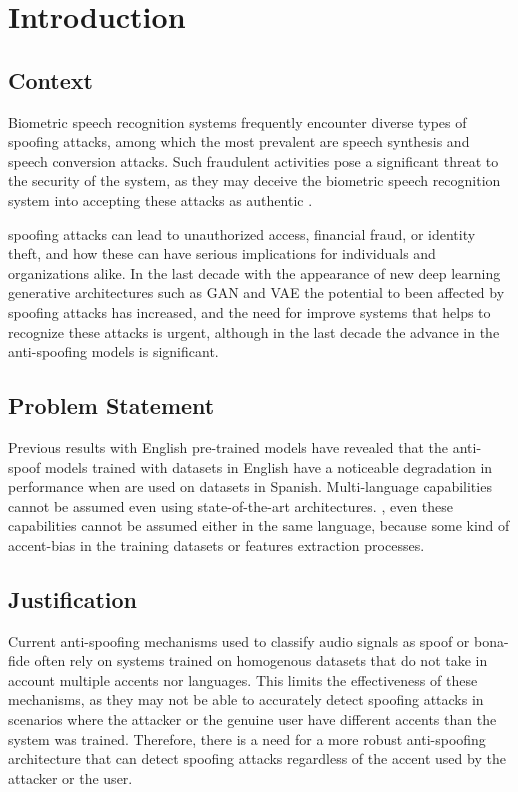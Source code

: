 \chapter{Introduction}

\section{Context}
Biometric speech recognition systems frequently encounter diverse types of spoofing attacks, among which the most prevalent are speech synthesis and speech conversion attacks. Such fraudulent activities pose a significant threat to the security of the system, as they may deceive the biometric speech recognition system into accepting these attacks as authentic \cite{xue2023physiological}.

spoofing attacks can lead to unauthorized access, financial fraud, or identity theft, and how these can have serious implications for individuals and organizations alike. In the last decade with the appearance of new deep learning generative architectures such as \ac{GAN} \cite{goodfellow2020generative} and \ac{VAE} \cite{kingma2013auto} the potential to been affected by spoofing attacks has increased, and the need for improve systems that helps to recognize these attacks is urgent, although in the last decade the advance in the anti-spoofing models is significant.

\section{Problem Statement}
Previous results with English pre-trained models have revealed that the anti-spoof models trained with datasets in English have a noticeable degradation in performance when are used on datasets in Spanish. Multi-language capabilities cannot be assumed even using state-of-the-art architectures. \cite{tamayo2022voice}, even these capabilities cannot be assumed either in the same language, because some kind of accent-bias in the training datasets or features extraction processes.

\section{Justification}
Current anti-spoofing mechanisms used to classify audio signals as spoof or bona-fide often rely on systems trained on homogenous datasets that do not take in account multiple accents nor languages. This limits the effectiveness of these mechanisms, as they may not be able to accurately detect spoofing attacks in scenarios where the attacker or the genuine user have different accents than the system was trained. Therefore, there is a need for a more robust anti-spoofing architecture that can detect spoofing attacks regardless of the accent used by the attacker or the user.


